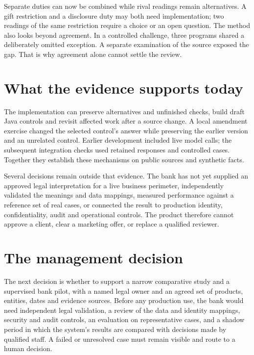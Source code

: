 \documentclass[12pt,a4paper,oneside,openany]{book}
\begin{document}
Separate duties can now be combined while rival readings remain alternatives.
A gift restriction and a disclosure duty may both need implementation; two
readings of the same restriction require a choice or an open question. The
method also looks beyond agreement. In a controlled challenge, three programs
shared a deliberately omitted exception. A separate examination of the source
exposed the gap. That is why agreement alone cannot settle the review.

\section*{What the evidence supports today}

The implementation can preserve alternatives and unfinished checks, build draft
Java controls and revisit affected work after a source change. A local amendment
exercise changed the selected control's answer while preserving the earlier
version and an unrelated control. Earlier development included live model calls;
the subsequent integration checks used retained responses and controlled cases.
Together they establish these mechanisms on public sources and synthetic facts.

Several decisions remain outside that evidence. The bank has not yet supplied
an approved legal interpretation for a live business perimeter, independently
validated the meanings and data mappings, measured performance against a
reference set of real cases, or connected the result to production identity,
confidentiality, audit and operational controls. The product therefore cannot
approve a client, clear a marketing offer, or replace a qualified reviewer.

\section*{The management decision}

The next decision is whether to support a narrow comparative study and a
supervised bank pilot, with a named legal owner and an agreed set of products,
entities, dates and evidence sources. Before
any production use, the bank would need independent legal validation, a review
of the data and identity mappings, security and audit controls, an evaluation on
representative cases, and a shadow period in which the system's results are
compared with decisions made by qualified staff. A failed or unresolved case
must remain visible and route to a human decision.
\end{document}
